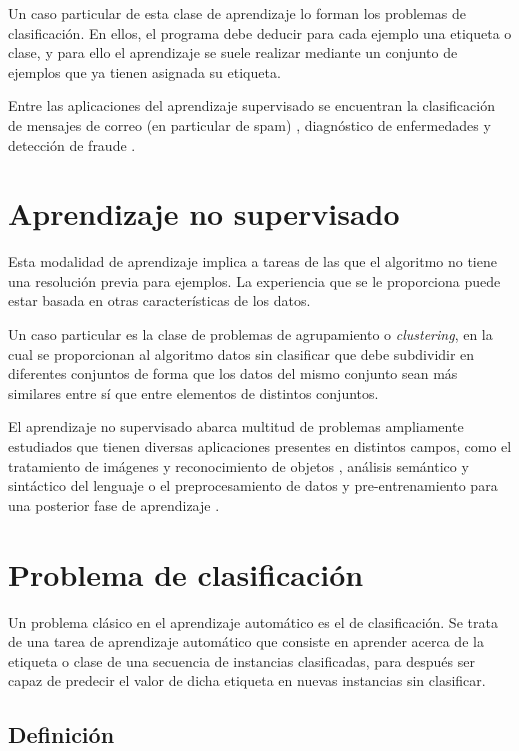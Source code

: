 Un caso particular de esta clase de aprendizaje lo forman los problemas
de clasificación. En ellos, el programa debe deducir para cada ejemplo
una etiqueta o clase, y para ello el aprendizaje se suele realizar
mediante un conjunto de ejemplos que ya tienen asignada su etiqueta.

Entre las aplicaciones del aprendizaje supervisado se encuentran la
clasificación de mensajes de correo (en particular de spam)
\autocite{cohen1996}, diagnóstico de enfermedades
\autocite{kononenko2001} y detección de fraude \autocite{phua2010}.

\section{Aprendizaje no supervisado}\label{aprendizaje-no-supervisado}

Esta modalidad de aprendizaje implica a tareas de las que el algoritmo
no tiene una resolución previa para ejemplos. La experiencia que se le
proporciona puede estar basada en otras características de los datos.

Un caso particular es la clase de problemas de agrupamiento o
\emph{clustering}, en la cual se proporcionan al algoritmo datos sin
clasificar que debe subdividir en diferentes conjuntos de forma que los
datos del mismo conjunto sean más similares entre sí que entre elementos
de distintos conjuntos.

El aprendizaje no supervisado abarca multitud de problemas ampliamente
estudiados que tienen diversas aplicaciones presentes en distintos
campos, como el tratamiento de imágenes y reconocimiento de objetos
\autocite{ranzato}, análisis semántico \autocite{hofmann} y sintáctico
del lenguaje \autocite{brent} o el preprocesamiento de datos y
pre-entrenamiento para una posterior fase de aprendizaje
\autocite{erhan2009}.

\section{Problema de clasificación}\label{problema-de-clasificaciuxf3n}

Un problema clásico en el aprendizaje automático es el de clasificación. Se trata de una tarea de aprendizaje automático que consiste en aprender acerca de la etiqueta o clase de una secuencia de instancias clasificadas, para después ser capaz de predecir el valor de dicha etiqueta en nuevas instancias sin clasificar.

\subsection{Definición}

